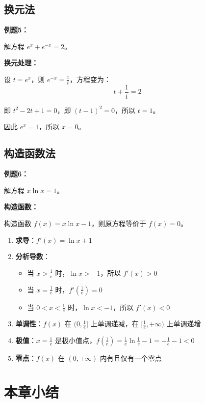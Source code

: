 \documentclass[a4paper,11pt]{ctexrep}
\newcommand{\exampleicon}{\ModeBadge[highlight]{例题}}
\newcommand{\analysisicon}{\ModeBadge[secondary]{分析}}
\theoremstyle{definition}
\begin{document}
\subsection{换元法}

\exampleicon \textbf{例题5：}

解方程 $e^x + e^{-x} = 2$。

\analysisicon \textbf{换元处理：}

设 $t = e^x$，则 $e^{-x} = \frac{1}{t}$，方程变为：
$$t + \frac{1}{t} = 2$$

即 $t^2 - 2t + 1 = 0$，即 $(t-1)^2 = 0$，所以 $t = 1$。

因此 $e^x = 1$，所以 $x = 0$。

\subsection{构造函数法}

\exampleicon \textbf{例题6：}

解方程 $x\ln x = 1$。

\analysisicon \textbf{构造函数：}

构造函数 $f(x) = x\ln x - 1$，则原方程等价于 $f(x) = 0$。

\begin{enumerate}
    \item \textbf{求导}：$f'(x) = \ln x + 1$
    \item \textbf{分析导数}：
    \begin{itemize}
        \item 当 $x > \frac{1}{e}$ 时，$\ln x > -1$，所以 $f'(x) > 0$
        \item 当 $x = \frac{1}{e}$ 时，$f'(\frac{1}{e}) = 0$
        \item 当 $0 < x < \frac{1}{e}$ 时，$\ln x < -1$，所以 $f'(x) < 0$
    \end{itemize}
    \item \textbf{单调性}：$f(x)$ 在 $(0, \frac{1}{e}]$ 上单调递减，在 $[\frac{1}{e}, +\infty)$ 上单调递增
    \item \textbf{极值}：$x = \frac{1}{e}$ 是极小值点，$f(\frac{1}{e}) = \frac{1}{e} \ln \frac{1}{e} - 1 = -\frac{1}{e} - 1 < 0$
    \item \textbf{零点}：$f(x)$ 在 $(0, +\infty)$ 内有且仅有一个零点
\end{enumerate}

\section{本章小结}
\end{document}
